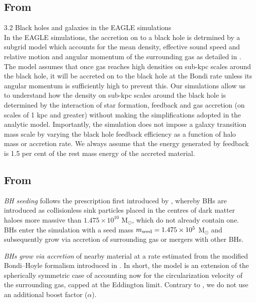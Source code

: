 \documentclass[11pt,a4paper]{article}
\begin{document}
\subsection{From \citet{Bower2017}}
3.2 Black holes and galaxies in the EAGLE simulations\\
In the EAGLE simulations, the accretion on to a black hole is
detrmined by a subgrid model which accounts for the mean density,
effective sound speed and relative motion and angular momentum of the
surrounding gas as detailed in \citet[][, with the exception that, in
the EAGLE simulations, we do not in- crease the accretion rate to
account for an unresolved clumping factor]{Rosas-Guevara2015}. The
model assumes that once gas reaches high densities on sub-kpc scales
around the black hole, it will be accreted on to the black hole at the
Bondi rate unless its angular momentum is sufficiently high to prevent
this. Our simulations allow us to understand how the density on
sub-kpc scales around the black hole is determined by the interaction
of star formation, feedback and gas accretion (on scales of 1 kpc and
greater) without making the simplifications adopted in the analytic
model. Importantly, the simulation does not impose a galaxy transition
mass scale by varying the black hole feedback efficiency as a function
of halo mass or accretion rate. We always assume that the energy
generated by feedback is 1.5 per cent of the rest mass energy of the
accreted material.




\subsection{From \citet{McAlpine2017}}

{\it BH seeding} follows the prescription first introduced by
\citet{Springel2005}, whereby BHs are introduced as collisionless sink
particles placed in the centres of dark matter haloes more massive
than $1.475\times10^{10}$ M$_{\odot}$, which do not already contain
one. BHs enter the simulation with a seed mass $m_{\rm seed} =
1.475\times 10^{5}$ M$_{\odot}$ and subsequently grow via accretion of
surrounding gas or mergers with other BHs.

{\it BHs grow via accretion} of nearby material at a rate estimated
from the modified Bondi–Hoyle formalism introduced in \citet{Rosas-Guevara2015}. 
In short, the model is an extension of the spherically 
symmetric case of \citet{Bondi_Hoyle1944} accounting now for the
circularization velocity of the surrounding gas, capped at the
Eddington limit. Contrary to \citet{Rosas-Guevara2015}, we do not
use an additional boost factor ($\alpha$).
\end{document}
